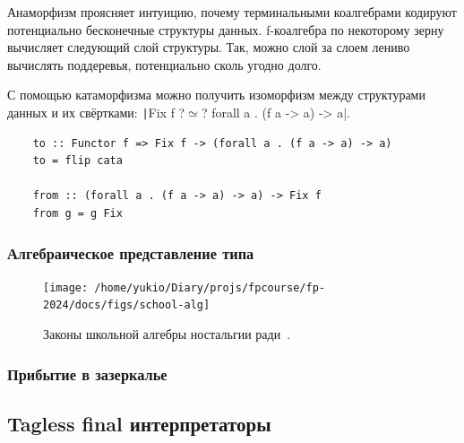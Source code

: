 Анаморфизм проясняет интуицию, почему терминальными коалгебрами кодируют потенциально бесконечные структуры данных.
f-коалгебра по некоторому зерну вычисляет следующий слой структуры.
Так, можно слой за слоем лениво вычислять поддеревья, потенциально сколь угодно долго.

С помощью катаморфизма можно получить изоморфизм между структурами данных и их свёртками:
\texttt|Fix f ?$\simeq$? forall a . (f a -> a) -> a|.
\begin{verbatim}
    to :: Functor f => Fix f -> (forall a . (f a -> a) -> a)
    to = flip cata

    from :: (forall a . (f a -> a) -> a) -> Fix f
    from g = g Fix
\end{verbatim}


\subsubsection{Алгебраическое представление типа}

\begin{figure}[h!]
    \centering
    \texttt{[image: /home/yukio/Diary/projs/fpcourse/fp-2024/docs/figs/school-alg]}
    \caption{Законы школьной алгебры ностальгии ради~\cite{hinze2010reason}.}
    \label{fig:school-alg}
\end{figure}


\cite[глава 1]{maguire-types}



\subsubsection{Прибытие в зазеркалье}







\subsection{Tagless final интерпретаторы}

